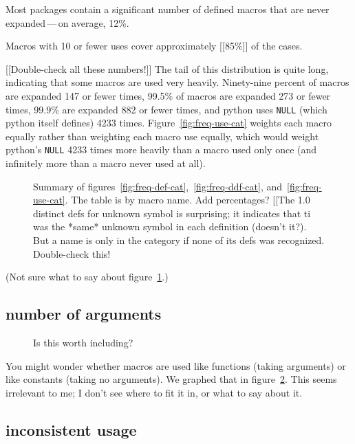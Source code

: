 \documentclass[10pt]{article}
\newcommand{\pkg}[1]{\textsf{#1}}
\begin{document}
Most packages contain a significant number of defined
macros that are never expanded\,---\,on average, 12\%.

Macros with 10 or fewer uses
cover approximately [[85\%]] of the cases.

[[Double-check all these numbers!]]
The tail of this distribution is quite long, indicating that some macros
are used very heavily.  Ninety-nine percent of macros are expanded 147 or fewer
times, 99.5\% of macros are expanded 273 or fewer times, 99.9\% are
expanded 882 or fewer times, and \pkg{python} uses {\tt NULL} (which \pkg{python}
itself defines) 4233 times.  Figure~\ref{fig:freq-use-cat} weights each macro
equally rather than weighting each macro use equally, which would weight
\pkg{python}'s {\tt NULL} 4233 times more heavily than a macro used only once
(and infinitely more than a macro never used at all).

\begin{figure}
  {\small\centerline{}}
  
  \caption{Summary of
    figures~\ref{fig:freq-def-cat},~\ref{fig:freq-ddf-cat},
    and~\ref{fig:freq-use-cat}.  The table is by macro name.  Add percentages?
    [[The 1.0 distinct defs for unknown symbol is surprising; it indicates
    that ti was the *same* unknown symbol in each definition (doesn't
    it?).  But a name is only in the category if none of its defs was
    recognized.  Double-check this!}
  \label{fig:freq-sum-cat}
\end{figure}

(Not sure what to say about figure~\ref{fig:freq-sum-cat}.)

\subsection{number of arguments}

\begin{figure}
\centerline{}
\caption{Is this worth including?}
\label{fig:cat-numargs}
\end{figure}

You might wonder whether macros are used like functions (taking arguments)
or like constants (taking no arguments).  We graphed that in
figure~\ref{fig:cat-numargs}.  This seems irrelevant to me; I don't see
where to fit it in, or what to say about it.

\subsection{inconsistent usage}
\end{document}
